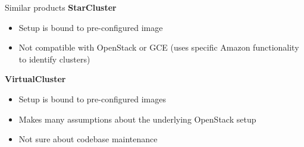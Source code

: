 \documentclass[english,serif,mathserif,usenames,dvipsnames]{beamer}
\begin{document}
\begin{frame}
  {Similar products}
  \textbf{StarCluster}
  \begin{itemize}
  \item Setup is bound to pre-configured image
  \item Not compatible with OpenStack or GCE (uses specific Amazon
    functionality to identify clusters)
  \end{itemize}

  \+

  \textbf{VirtualCluster}
  \begin{itemize}
  \item Setup is bound to pre-configured images
  \item Makes many assumptions about the underlying OpenStack setup
  \item Not sure about codebase maintenance
  \end{itemize}
\end{frame}




\end{document}
